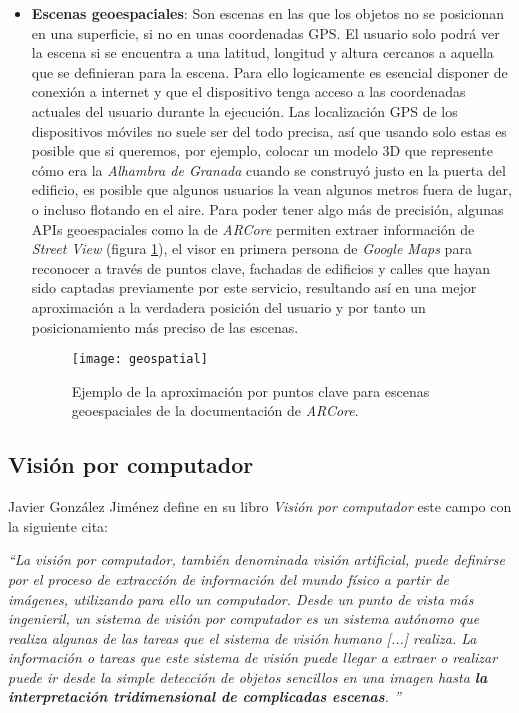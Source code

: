 \begin{itemize}
    \item \textbf{Escenas geoespaciales}: Son escenas en las que los objetos no se posicionan en una superficie, si no en unas coordenadas GPS. El usuario solo podrá ver la escena si se encuentra a una latitud, longitud y altura cercanos a aquella que se definieran para la escena. Para ello logicamente es esencial disponer de conexión a internet y que el dispositivo tenga acceso a las coordenadas actuales del usuario durante la ejecución. Las localización GPS de los dispositivos móviles no suele ser del todo precisa, así que usando solo estas es posible que si queremos, por ejemplo, colocar un modelo 3D que represente cómo era la \textit{Alhambra de Granada} cuando se construyó justo en la puerta del edificio, es posible que algunos usuarios la vean algunos metros fuera de lugar, o incluso flotando en el aire. Para poder tener algo más de precisión, algunas APIs geoespaciales como la de \textit{ARCore}\cite{arcore} permiten  extraer información de \textit{Street View} (figura \ref{fig:geospatial}), el visor en primera persona de \textit{Google Maps} para reconocer a través de puntos clave, fachadas de edificios y calles que hayan sido captadas previamente por este servicio, resultando así en una mejor aproximación a la verdadera posición del usuario y por tanto un posicionamiento más preciso de las escenas.

    \begin{figure}[H]
        \centering
        \texttt{[image: geospatial]}
        \caption[Reconocimiento de puntos clave para escena geoespacial]{Ejemplo de la aproximación por puntos clave para escenas geoespaciales de la documentación de \textit{ARCore}\cite{arcore}.}
        \label{fig:geospatial}
    \end{figure}

\end{itemize}


\subsection{Visión por computador}
Javier González Jiménez define en su libro \textit{Visión por computador}\cite{visioncomputador} este campo con la siguiente cita:


    \textit{``La visión por computador, también denominada visión artificial, puede definirse por el proceso de extracción de información del mundo físico a partir de imágenes, utilizando para ello un computador. Desde un punto de vista más ingenieril, un sistema de visión por computador es un sistema autónomo que realiza algunas de las tareas que el sistema de visión humano [...] realiza. La información o tareas que este sistema de visión puede llegar a extraer o realizar puede ir desde la simple detección de objetos sencillos en una imagen hasta \textbf{la interpretación tridimensional de complicadas escenas}.
    ''}

